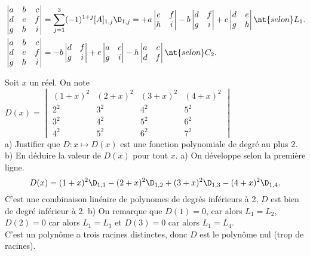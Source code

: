 \documentclass[11pt]{article}
\begin{document}
\begin{app}{}{}
    \begin{align*}
        &\begin{vmatrix}
            a&b&c\\
            d&e&f\\
            g&h&i
        \end{vmatrix} = \sum_{j=1}^3(-1)^{1+j}[A]_{1,j}\D_{1,j}=+a\begin{vmatrix}e&f\\h&i\end{vmatrix}-b\begin{vmatrix}d&f\\g&i\end{vmatrix}+c\begin{vmatrix}d&e\\g&h\end{vmatrix} \nt{selon } L_1.\\
        &\begin{vmatrix}
            a&b&c\\
            d&e&f\\
            g&h&i
        \end{vmatrix} = -b\begin{vmatrix}d&f\\g&i\end{vmatrix}+e\begin{vmatrix}a&c\\g&i\end{vmatrix}-h\begin{vmatrix}a&c\\d&f\end{vmatrix} \nt{selon } C_2.
    \end{align*}
\end{app}

\begin{ex}{}{}
    Soit $x$ un réel. On note $D(x)=\begin{vmatrix}
        (1+x)^2&(2+x)^2&(3+x)^2&(4+x)^2\\
        2^2&3^2&4^2&5^2\\
        3^2&4^2&5^2&6^2\\
        4^2&5^2&6^2&7^2
    \end{vmatrix}$\\
    a) Justifier que $D:x\mapsto D(x)$ est une fonction polynomiale de degré au plus 2.\\
    b) En déduire la valeur de $D(x)$ pour tout $x$.
    \tcblower
    a) On développe selon la première ligne.
    \begin{equation*}
        D(x)=(1+x)^2\D_{1,1}-(2+x)^2\D_{1,2}+(3+x)^2\D_{1,3}-(4+x)^2\D_{1,4}.
    \end{equation*}
    C'est une combinaison linéaire de polynomes de degrés inférieurs à 2, $D$ est bien de degré inférieur à 2.\n
    b) On remarque que $D(1)=0$, car alors $L_1=L_2$, $D(2)=0$ car alors $L_1=L_3$ et $D(3)=0$ car alors $L_1=L_4$.\\
    C'est un polynôme a trois racines distinctes, donc $D$ est le polynôme nul (trop de racines).
\end{ex}
\end{document}
